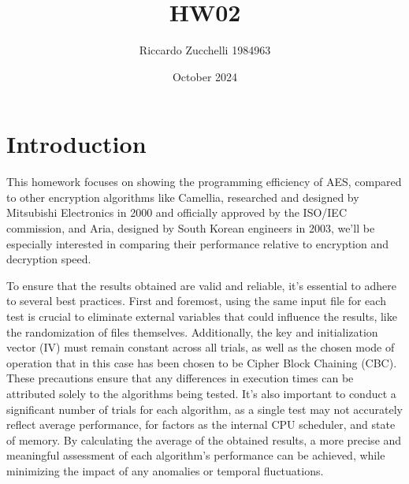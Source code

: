 \documentclass{article}
\title{HW02}
\author{Riccardo Zucchelli 1984963}
\date{October 2024}
\begin{document}
\maketitle

\section{Introduction}
This homework focuses on showing the programming efficiency of AES, compared to other encryption algorithms like Camellia, researched and designed by Mitsubishi Electronics in 2000 and officially approved by the ISO/IEC commission, and Aria, designed by South Korean engineers in 2003, we'll be especially interested in comparing their performance relative to encryption and decryption speed.

To ensure that the results obtained are valid and reliable, it's essential to adhere to several best practices.
First and foremost, using the same input file for each test is crucial to eliminate external variables that could influence the results, like the randomization of files themselves. Additionally, the key and initialization vector (IV) must remain constant across all trials, as well as the chosen mode of operation that in this case has been chosen to be Cipher Block Chaining (CBC). These precautions ensure that any differences in execution times can be attributed solely to the algorithms being tested.
It's also important to conduct a significant number of trials for each algorithm, as a single test may not accurately reflect average performance, for factors as the internal CPU scheduler, and state of memory. By calculating the average of the obtained results, a more precise and meaningful assessment of each algorithm's performance can be achieved, while minimizing the impact of any anomalies or temporal fluctuations. 
\end{document}
